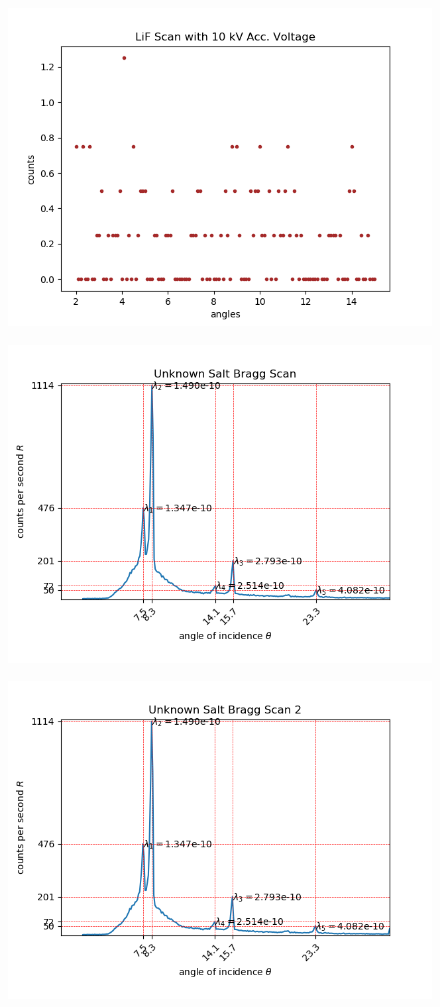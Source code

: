 \documentclass[8pt, a4paper]{article}
\begin{document}
\begin{figure}[h]
\includegraphics{ve4}
\end{figure}

\begin{figure}[h]
\includegraphics{uks1}
\end{figure}

\begin{figure}[h]
\includegraphics{uks2}
\end{figure}
\end{document}
